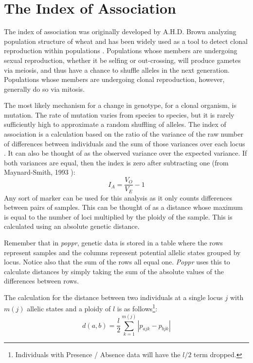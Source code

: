 \documentclass[letterpaper]{article}\usepackage[]{graphicx}\usepackage[]{color}
\newcommand{\poppr}{\textit{poppr}}
\newcommand{\Poppr}{\textit{Poppr}}
\begin{document}
\section{The Index of Association}
\label{indexassoc}

The index of association was originally developed by A.H.D. Brown analyzing
population structure of wheat and has been widely used as a tool to detect
clonal reproduction within populations \cite{Brown:1980, Smith:1993}.
Populations whose members are undergoing sexual reproduction, whether it be
selfing or out-crossing, will produce gametes via meiosis, and thus have a
chance to shuffle alleles in the next generation. Populations whose members are
undergoing clonal reproduction, however, generally do so via mitosis.

The most likely mechanism for a change in genotype, for a clonal organism, is 
mutation. The rate of mutation varies from species to species, but it is rarely
sufficiently high to approximate a random shuffling of alleles. The index of
association is a calculation based on the ratio of the variance of the raw
number of differences between individuals and the sum of those variances over
each locus \cite{Smith:1993}. It can also be thought of as the observed variance
over the expected variance. If both variances are equal, then the index is zero
after subtracting one (from Maynard-Smith, 1993 \cite{Smith:1993}):
\begin{equation}
\label{eq:I_A}
I_A = \frac{V_O}{V_E}-1
\end{equation}
Any sort of marker can be used for this analysis as it only counts differences
between pairs of samples. This can be thought of as a distance whose maximum is
equal to the number of loci multiplied by the ploidy of the sample. This is
calculated using an absolute genetic distance.

Remember that in \poppr{}, genetic data is stored in a table where the rows
represent samples and the columns represent potential allelic states grouped by
locus. Notice also that the sum of the rows all equal one. \Poppr{} uses this to
calculate distances by simply taking the sum of the absolute values of the
differences between rows.

The calculation for the distance between two individuals at a single locus $j$
with $m(j)$ allelic states and a ploidy of $l$ is as follows\footnote{Individuals
with Presence / Absence data will have the $l/2$ term dropped.}:
\begin{equation}
\label{eq:ia_d}
  d(a,b)=\frac{l}{2} \sum_{k=1}^{m(j)}
  |p_{ajk} - p_{bjk}|
\end{equation}
\end{document}
